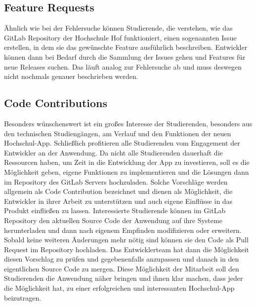 \subsection*{Feature Requests}
\label{sec:featurerequests}

Ähnlich wie bei der Fehlersuche können Studierende, die verstehen, wie das GitLab Repository der Hochschule Hof funktioniert, einen sogenannten Issue erstellen, in dem sie das gewünschte Feature ausführlich beschreiben. Entwickler können dann bei Bedarf durch die Sammlung der Issues gehen und Features für neue Releases suchen. Das läuft analog zur Fehlersuche ab und muss deswegen nicht nochmals genauer beschrieben werden.

\subsection*{Code Contributions}
\label{sec:codecontributions}

Besonders wünschenswert ist ein großes Interesse der Studierenden, besonders aus den technischen Studiengängen, am Verlauf und den Funktionen der neuen Hoch\-schul-\ac{App}. Schließlich profitieren alle Studierenden vom Engagement der Entwickler an der Anwendung. Da nicht alle Studierenden dauerhaft die Ressourcen haben, um Zeit in die Entwicklung der \ac{App} zu investieren, soll es die Möglichkeit geben, eigene Funktionen zu implementieren und die Lösungen dann im Repository des GitLab Servers hochzuladen. Solche Vorschläge werden allgemein als Code Contribution bezeichnet und dienen als Möglichkeit, die Entwickler in ihrer Arbeit zu unterstützen und auch eigene Einflüsse in das Produkt einfließen zu lassen. Interessierte Studierende können im GitLab Repository den aktuellen Source Code der Anwendung auf ihre Systeme herunterladen und dann nach eigenem Empfinden modifizieren oder erweitern. Sobald keine weiteren Änderungen mehr nötig sind können sie den Code als Pull Request im Repository hochladen. Das Entwicklerteam hat dann die Möglichkeit diesen Vorschlag zu prüfen und  gegebenenfalls anzupassen und danach in den eigentlichen Source Code zu mergen. Diese Möglichkeit der Mitarbeit soll den Studierenden die Anwendung näher bringen und ihnen klar machen, dass jeder die Möglichkeit hat, zu einer erfolgreichen und interessanten Hochschul-\ac{App} beizutragen.
